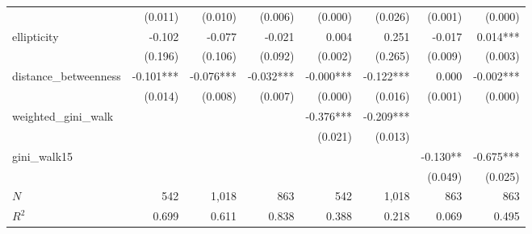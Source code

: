 \begin{tabular}{lrrrrrrr}
                      &                      (0.011) &                    (0.010) &                      (0.006) &                      (0.000) &                    (0.026) &                              (0.001) &                              (0.000) \\ 
ellipticity           &                       -0.102 &                     -0.077 &                       -0.021 &                        0.004 &                      0.251 &                               -0.017 &                             0.014*** \\ 
                      &                      (0.196) &                    (0.106) &                      (0.092) &                      (0.002) &                    (0.265) &                              (0.009) &                              (0.003) \\ 
distance\_betweenness &                    -0.101*** &                  -0.076*** &                    -0.032*** &                    -0.000*** &                  -0.122*** &                                0.000 &                            -0.002*** \\ 
                      &                      (0.014) &                    (0.008) &                      (0.007) &                      (0.000) &                    (0.016) &                              (0.001) &                              (0.000) \\ 
weighted\_gini\_walk  &                              &                            &                              &                    -0.376*** &                  -0.209*** &                                      &                                      \\ 
                      &                              &                            &                              &                      (0.021) &                    (0.013) &                                      &                                      \\ 
gini\_walk15          &                              &                            &                              &                              &                            &                             -0.130** &                            -0.675*** \\ 
                      &                              &                            &                              &                              &                            &                              (0.049) &                              (0.025) \\ 
\midrule
$N$                   &                          542 &                      1,018 &                          863 &                          542 &                      1,018 &                                  863 &                                  863 \\ 
$R^2$                 &                        0.699 &                      0.611 &                        0.838 &                        0.388 &                      0.218 &                                0.069 &                                0.495 \\ 
\bottomrule
\end{tabular}
